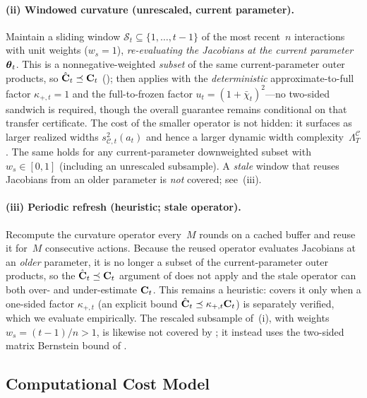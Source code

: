 \documentclass[twoside]{article}
\newcommand{\Calg}{\mathcal{C}}                 %
\newcommand{\Lamalg}{\Lambda^{\Calg}}           %
\begin{document}
\paragraph{(ii) Windowed curvature (unrescaled, current parameter).}
Maintain a sliding window $\mathcal{S}_t\subseteq\{1,\dots,t{-}1\}$ of the most
recent~$n$ interactions with unit weights ($w_s{=}1$), \emph{re-evaluating the
Jacobians at the current parameter}~$\boldsymbol{\theta}_t$.  This is a nonnegative-weighted
\emph{subset} of the same current-parameter outer products, so
$\hat{\mathbf{C}}_t\preceq\mathbf{C}_t$ ();  then
applies with the \emph{deterministic} approximate-to-full factor $\kappa_{+,t}{=}1$
and the full-to-frozen factor $u_t=(1+\bar\chi_t)^2$---no two-sided sandwich is
required, though the overall guarantee remains conditional on that transfer
certificate.  The cost of the
smaller operator is not hidden: it surfaces as larger realized widths
$s_{\Calg,t}^2(a_t)$ and hence a larger dynamic width complexity~$\Lamalg_T$.  The
same holds for any current-parameter downweighted subset with $w_s\in[0,1]$
(including an unrescaled subsample).  A \emph{stale} window that reuses Jacobians
from an older parameter is \emph{not} covered; see~(iii).

\paragraph{(iii) Periodic refresh (heuristic; stale operator).}
Recompute the curvature operator every~$M$ rounds on a cached buffer and reuse it
for~$M$ consecutive actions.  Because the reused operator evaluates Jacobians at
an \emph{older} parameter, it is no longer a subset of the current-parameter
outer products, so the $\hat{\mathbf{C}}_t\preceq\mathbf{C}_t$ argument of  does
not apply and the stale operator can both over- and under-estimate $\mathbf{C}_t$.  This
remains a heuristic:  covers it only when a
one-sided factor $\kappa_{+,t}$ (an explicit bound
$\hat{\mathbf{C}}_t\preceq\kappa_{+,t}\mathbf{C}_t$) is separately verified, which we evaluate
empirically.  The rescaled subsample of~(i), with weights $w_s=(t{-}1)/n>1$, is
likewise not covered by ; it instead uses the two-sided matrix
Bernstein bound of .

\subsection{Computational Cost Model}\label{sec:systems}
\end{document}
